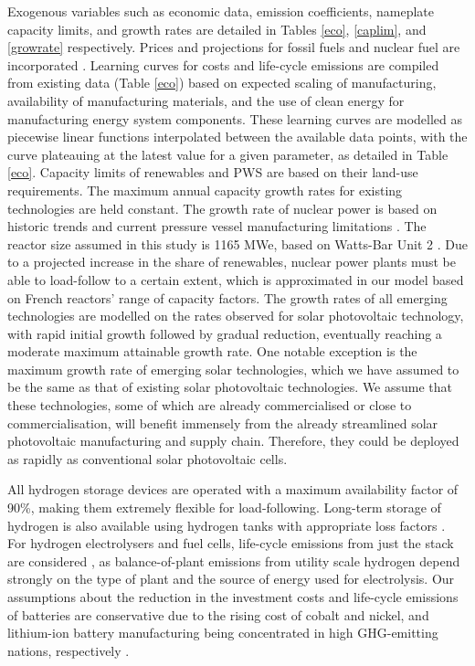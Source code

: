 Exogenous variables such as economic data, emission coefficients, nameplate capacity limits, and growth rates are detailed in Tables \ref{eco}, \ref{caplim}, and \ref{growrate} respectively. Prices and projections for fossil fuels and nuclear fuel are incorporated \cite{wittenstein_projected_2015, world_bank_commodity_2016, international_energy_agency_world_2019}. Learning curves for costs and life-cycle emissions are compiled from existing data (Table \ref{eco}) based on expected scaling of manufacturing, availability of manufacturing materials, and the use of clean energy for manufacturing energy system components. These learning curves are modelled as piecewise linear functions interpolated between the available data points, with the curve plateauing at the latest value for a given parameter, as detailed in Table \ref{eco}. Capacity limits of renewables and \gls{PWS} are based on their land-use requirements. The maximum annual capacity growth rates for existing technologies are held constant. The growth rate of nuclear power is based on historic trends and current pressure vessel manufacturing limitations \cite{iaea_pris_nodate}. The reactor size assumed in this study is 1165 MWe, based on Watts-Bar Unit 2 \cite{iaea_pris_nodate-1}. Due to a projected increase in the share of renewables, nuclear power plants must be able to load-follow to a certain extent, which is approximated in our model based on French reactors' range of capacity factors. The growth rates of all emerging technologies are modelled on the rates observed for solar photovoltaic technology, with rapid initial growth followed by gradual reduction, eventually reaching a moderate maximum attainable growth rate. One notable exception is the maximum growth rate of emerging solar technologies, which we have assumed to be the same as that of existing solar photovoltaic technologies. We assume that these technologies, some of which are already commercialised or close to commercialisation, will benefit immensely from the already streamlined solar photovoltaic manufacturing and supply chain. Therefore, they could be deployed as rapidly as conventional solar photovoltaic cells. 

All hydrogen storage devices are operated with a maximum availability factor of 90\%, making them extremely flexible for load-following. Long-term storage of hydrogen is also available using hydrogen tanks with appropriate loss factors \cite{iea_technology_2015}. For hydrogen electrolysers and fuel cells, life-cycle emissions from just the stack are considered \DIFaddbegin {}\DIFaddend , as balance-of-plant emissions from utility scale hydrogen depend strongly on the type of plant and the source of energy used for electrolysis. Our assumptions about the reduction in the investment costs and life-cycle emissions of batteries are conservative due to the rising cost of cobalt and nickel, and lithium-ion battery manufacturing being concentrated in high \gls{GHG}-emitting nations, respectively \cite{oliveira_environmental_2015,emilsson_lithium-ion_2019,turcheniuk_ten_2018,simon_potential_2015}. 




